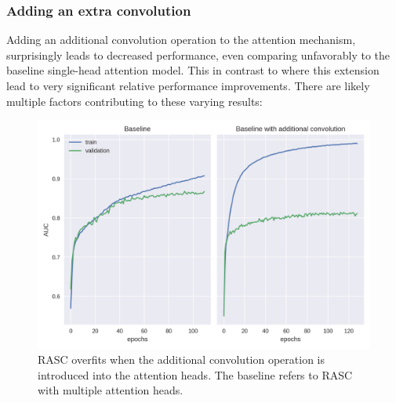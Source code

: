 
\subsubsection{Adding an extra convolution}
Adding an additional convolution operation to the attention mechanism, surprisingly leads to decreased performance, even comparing unfavorably to the baseline single-head attention model. This in contrast to \cite{ghentransformers} where this extension lead to very significant relative performance improvements. There are likely multiple factors contributing to these varying results:

\begin{figure}
	\centering\includegraphics[width=1\textwidth]{../visualizations/ch5-results/training_curve_conv_heads2.png} 
	\caption{RASC overfits when the additional convolution operation is introduced into the attention heads. The baseline refers to RASC with multiple attention heads. }
	\label{fig:training_curve}
\end{figure}


